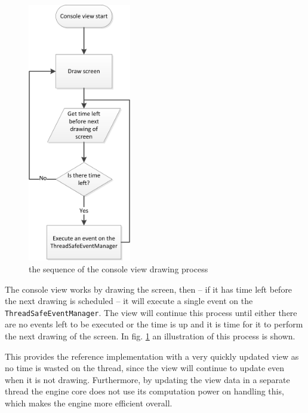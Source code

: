 \begin{figure}
\begin{centering}
\includegraphics[width=0.4\textwidth]{ConsoleViewDrawingFlowChart}
\par\end{centering}

\caption{the sequence of the console view drawing process\label{fig:FlowOfConsole}}


\end{figure}


The console view works by drawing the screen, then -- if it has time
left before the next drawing is scheduled -- it will execute a single
event on the \texttt{ThreadSafeEventManager}. The view will continue
this process until either there are no events left to be executed
or the time is up and it is time for it to perform the next drawing
of the screen. In fig. \ref{fig:FlowOfConsole} an illustration of
this process is shown.

This provides the reference implementation with a very quickly updated
view as no time is wasted on the thread, since the view will continue
to update even when it is not drawing. Furthermore, by updating the
view data in a separate thread the engine core does not use its computation
power on handling this, which makes the engine more efficient overall.


